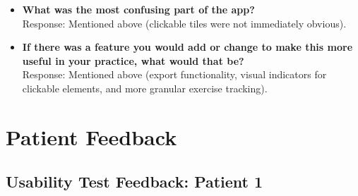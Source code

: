 \documentclass[12pt, titlepage]{article}
\begin{document}
\begin{itemize}
    \item \textbf{What was the most confusing part of the app?} \\
    Response: Mentioned above (clickable tiles were not immediately obvious).

    \item \textbf{If there was a feature you would add or change to make this more useful in your practice, what would that be?} \\
    Response: Mentioned above (export functionality, visual indicators for clickable elements, and more granular exercise tracking).
\end{itemize}

\section{Patient Feedback}
\subsection{Usability Test Feedback: Patient 1}
\end{document}
